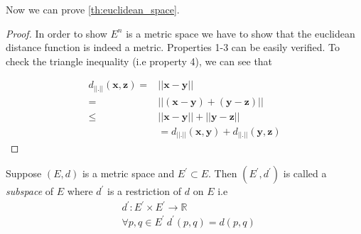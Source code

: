 Now we can prove \ref{th:euclidean_space}.
\begin{proof}
    In order to show $E^n$ is a metric space we have to show that the euclidean distance function
    is indeed a metric. Properties 1-3 can be easily verified. To check the triangle inequality (i.e
    property 4), we can see that 

    \begin{displaymath}
	\begin{aligned}
	    d_{\lvert\lvert . \rvert\rvert}(\mathbf{x},\mathbf{z}) = & \lvert\lvert \mathbf{x}
	    - \mathbf{y} \rvert\rvert \\
	    = & \lvert\lvert (\mathbf{x} - \mathbf{y}) + (\mathbf{y} - \mathbf{z}) \rvert\rvert \\
	    \leq & \lvert\lvert \mathbf{x} - \mathbf{y} \rvert\rvert + \lvert\lvert \mathbf{y} -
	    \mathbf{z} \rvert\rvert \\
	    & = d_{\lvert\lvert . \rvert\rvert}(\mathbf{x},\mathbf{y}) + 
	    d_{\lvert\lvert . \rvert\rvert}(\mathbf{y},\mathbf{z})
	\end{aligned}
    \end{displaymath}
\end{proof}

\begin{Definition}
    Suppose $(E,d)$ is a metric space and $E^{\prime} \subset E$. Then $(E^{\prime},d^{\prime})$ is
    called a \emph{subspace} of $E$ where $d^{\prime}$ is a restriction of $d$ on $E$ i.e
    \begin{displaymath}
	\begin{aligned}
	    & d^{\prime} : E^{\prime} \times E^{\prime} \rightarrow \mathbb{R} \\
	& \forall p,q \in E^{\prime} \ d^{\prime}(p,q) = d(p,q)
	\end{aligned}
    \end{displaymath}	
\end{Definition}

